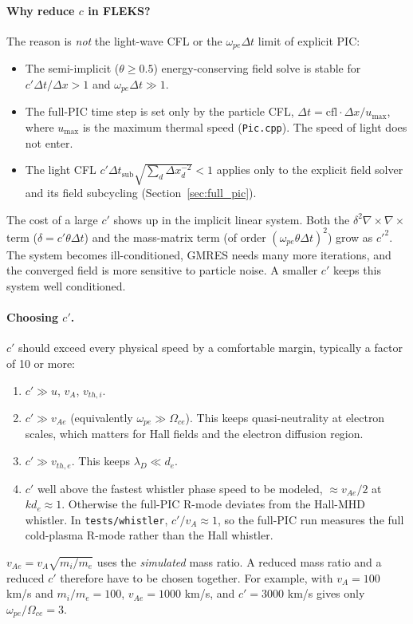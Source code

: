 \documentclass[a4paper, 11pt]{article}
\begin{document}
\paragraph{Why reduce $c$ in FLEKS?} The reason is \emph{not} the light-wave CFL or the $\omega_{pe}\Delta t$ limit of explicit PIC:
\begin{itemize}
  \item The semi-implicit ($\theta \ge 0.5$) energy-conserving field solve is stable for $c'\Delta t/\Delta x > 1$ and $\omega_{pe}\Delta t \gg 1$.
  \item The full-PIC time step is set only by the particle CFL, $\Delta t = \mathrm{cfl}\cdot\Delta x/u_{\max}$, where $u_{\max}$ is the maximum thermal speed (\texttt{Pic.cpp}). The speed of light does not enter.
  \item The light CFL $c'\Delta t_{\text{sub}}\sqrt{\sum_d \Delta x_d^{-2}} < 1$ applies only to the explicit field solver and its field subcycling (Section~\ref{sec:full_pic}).
\end{itemize}
The cost of a large $c'$ shows up in the implicit linear system. Both the $\delta^2\nabla\times\nabla\times$ term ($\delta = c'\theta\Delta t$) and the mass-matrix term (of order $(\omega_{pe}\theta\Delta t)^2$) grow as $c'^2$. The system becomes ill-conditioned, GMRES needs many more iterations, and the converged field is more sensitive to particle noise. A smaller $c'$ keeps this system well conditioned.

\paragraph{Choosing $c'$.} $c'$ should exceed every physical speed by a comfortable margin, typically a factor of 10 or more:
\begin{enumerate}
  \item $c' \gg u$, $v_A$, $v_{th,i}$.
  \item $c' \gg v_{Ae}$ (equivalently $\omega_{pe} \gg \Omega_{ce}$). This keeps quasi-neutrality at electron scales, which matters for Hall fields and the electron diffusion region.
  \item $c' \gg v_{th,e}$. This keeps $\lambda_D \ll d_e$.
  \item $c'$ well above the fastest whistler phase speed to be modeled, $\approx v_{Ae}/2$ at $k d_e \approx 1$. Otherwise the full-PIC R-mode deviates from the Hall-MHD whistler. In \texttt{tests/whistler}, $c'/v_A \approx 1$, so the full-PIC run measures the full cold-plasma R-mode rather than the Hall whistler.
\end{enumerate}
$v_{Ae} = v_A\sqrt{m_i/m_e}$ uses the \emph{simulated} mass ratio. A reduced mass ratio and a reduced $c'$ therefore have to be chosen together. For example, with $v_A = 100$ km/s and $m_i/m_e = 100$, $v_{Ae} = 1000$ km/s, and $c' = 3000$ km/s gives only $\omega_{pe}/\Omega_{ce} = 3$.
\end{document}
